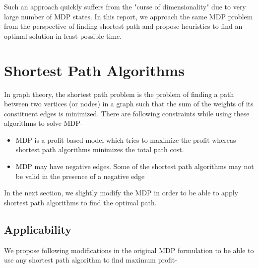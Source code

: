 \documentclass[a4paper,12pt]{article}
\begin{document}
Such an approach quickly suffers from the "curse of dimensionality" due to very large number of MDP states. In this report, we approach the same MDP problem from the perspective of finding shortest path and propose heuristics to find an optimal solution in least possible time.

\section{Shortest Path Algorithms}
In graph theory, the shortest path problem is the problem of finding a path between two vertices (or nodes) in a graph such that the sum of the weights of its constituent edges is minimized. There are following constraints while using these algorithms to solve MDP-
\begin{itemize}
\item MDP is a profit based model which tries to maximize the profit whereas shortest path algorithms minimizes the total path cost.
\item MDP may have negative edges. Some of the shortest path algorithms may not be valid in the presence of a negative edge
\end{itemize}

In the next section, we slightly modify the MDP in order to be able to apply shortest path algorithms to find the optimal path.

\subsection{Applicability}
We propose following modifications in the original MDP formulation to be able to use any shortest path algorithm to find maximum profit-
\end{document}
